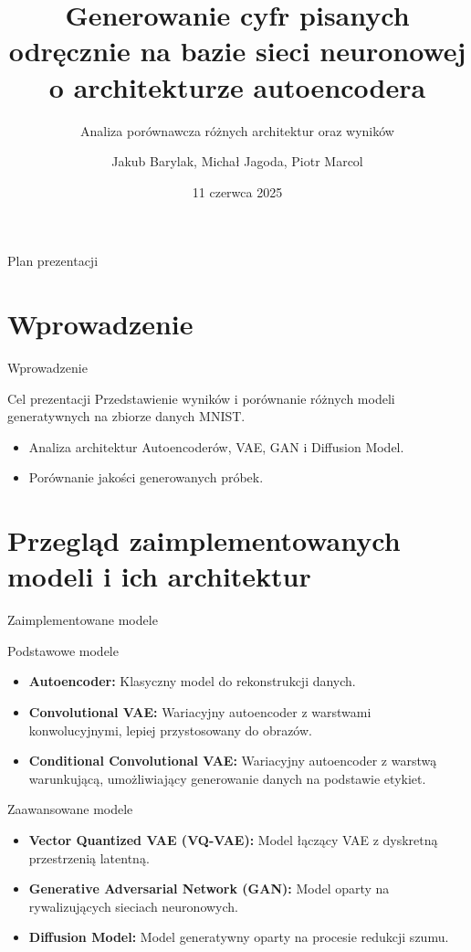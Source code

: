 \documentclass{beamer}
\title{Generowanie cyfr pisanych odręcznie na bazie sieci neuronowej o architekturze autoencodera}
\subtitle{Analiza porównawcza różnych architektur oraz wyników}
\author{Jakub Barylak, Michał Jagoda, Piotr Marcol}
\institute{Politechnika Śląska}
\date{11 czerwca 2025}
\begin{document}
\begin{frame}
    \titlepage
\end{frame}

\begin{frame}{Plan prezentacji}
    \tableofcontents
\end{frame}

\section{Wprowadzenie}
\begin{frame}{Wprowadzenie}
    \begin{block}{Cel prezentacji}
        Przedstawienie wyników i porównanie różnych modeli generatywnych na zbiorze danych MNIST.
    \end{block}
    \begin{itemize}
        \item Analiza architektur Autoencoderów, VAE, GAN i Diffusion Model.
        \item Porównanie jakości generowanych próbek.
    \end{itemize}
\end{frame}
\section{Przegląd zaimplementowanych modeli i ich architektur}

\begin{frame}{Zaimplementowane modele}
    \begin{block}{Podstawowe modele}
        \begin{itemize}
            \item \textbf{Autoencoder:} Klasyczny model do rekonstrukcji danych.
            \item \textbf{Convolutional VAE:} Wariacyjny autoencoder z warstwami konwolucyjnymi, lepiej przystosowany do obrazów.
            \item \textbf{Conditional Convolutional VAE:} Wariacyjny autoencoder z warstwą warunkującą, umożliwiający generowanie danych na podstawie etykiet.
        \end{itemize}
    \end{block}
    \begin{block}{Zaawansowane modele}
        \begin{itemize}
            \item \textbf{Vector Quantized VAE (VQ-VAE):} Model łączący VAE z dyskretną przestrzenią latentną.
            \item \textbf{Generative Adversarial Network (GAN):} Model oparty na rywalizujących sieciach neuronowych.
            \item \textbf{Diffusion Model:} Model generatywny oparty na procesie redukcji szumu.
        \end{itemize}
    \end{block}
\end{frame}
\end{document}
